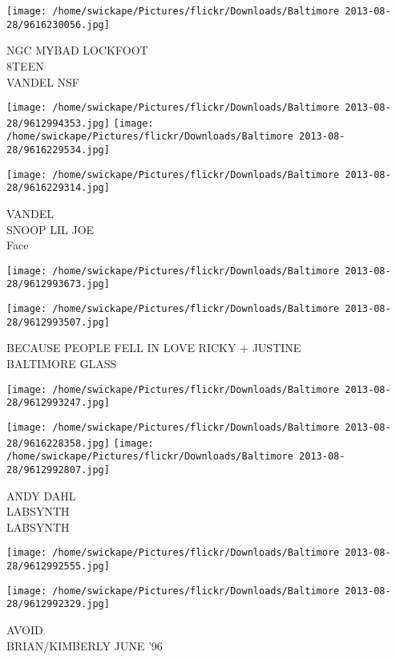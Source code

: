 \documentclass[10pt,letterpaper]{article}
\begin{document}
\vspace{0.25in}
\texttt{[image: /home/swickape/Pictures/flickr/Downloads/Baltimore 2013-08-28/9616230056.jpg]}

NGC MYBAD LOCKFOOT\\
8TEEN\\
VANDEL NSF
\pagebreak

\texttt{[image: /home/swickape/Pictures/flickr/Downloads/Baltimore 2013-08-28/9612994353.jpg]}
\texttt{[image: /home/swickape/Pictures/flickr/Downloads/Baltimore 2013-08-28/9616229534.jpg]}

\vspace{0.25in}
\texttt{[image: /home/swickape/Pictures/flickr/Downloads/Baltimore 2013-08-28/9616229314.jpg]}

VANDEL\\
SNOOP LIL JOE\\
Face
\pagebreak

\texttt{[image: /home/swickape/Pictures/flickr/Downloads/Baltimore 2013-08-28/9612993673.jpg]}

\vspace{0.25in}
\texttt{[image: /home/swickape/Pictures/flickr/Downloads/Baltimore 2013-08-28/9612993507.jpg]}

BECAUSE PEOPLE FELL IN LOVE RICKY + JUSTINE\\
BALTIMORE GLASS
\pagebreak

\texttt{[image: /home/swickape/Pictures/flickr/Downloads/Baltimore 2013-08-28/9612993247.jpg]}

\vspace{0.25in}
\texttt{[image: /home/swickape/Pictures/flickr/Downloads/Baltimore 2013-08-28/9616228358.jpg]}
\texttt{[image: /home/swickape/Pictures/flickr/Downloads/Baltimore 2013-08-28/9612992807.jpg]}

ANDY DAHL\\
LABSYNTH\\
LABSYNTH
\pagebreak

\texttt{[image: /home/swickape/Pictures/flickr/Downloads/Baltimore 2013-08-28/9612992555.jpg]}

\vspace{0.25in}
\texttt{[image: /home/swickape/Pictures/flickr/Downloads/Baltimore 2013-08-28/9612992329.jpg]}

AVOID\\
BRIAN/KIMBERLY JUNE '96
\pagebreak
\end{document}
